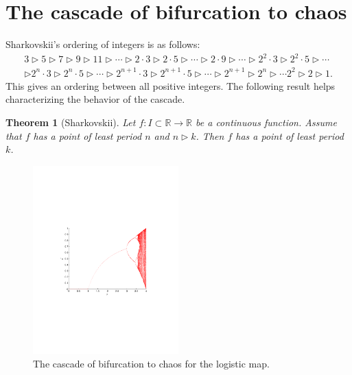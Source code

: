 \documentclass[12pt]{article}
\theoremstyle{plain}
\newtheorem{theorem}{Theorem}[section]
\def\IR{\mathbb{R}}
\begin{document}
\section{The cascade of bifurcation to chaos}
\label{sec:chaos}
Sharkovskii's ordering of integers is as follows:
\begin{gather*}
3\triangleright 5\triangleright 7 \triangleright 9 \triangleright 11\triangleright \cdots \triangleright 2\cdot 3\triangleright  2\cdot 5\triangleright \cdots \triangleright 2\cdot 9\triangleright\cdots\triangleright 2^2\cdot 3\triangleright 2^2\cdot 5\triangleright \cdots \\
\triangleright 2^n\cdot 3\triangleright 2^n\cdot 5\triangleright \cdots\triangleright 2^{n+1}\cdot 3\triangleright 2^{n+1}\cdot 5\triangleright \cdots
\triangleright 2^{n+1}\triangleright 2^n\triangleright \cdots 2^2 \triangleright 2\triangleright 1.
\end{gather*}
This gives an ordering between all positive integers. The following result helps characterizing the behavior of the cascade.
\begin{theorem}[Sharkovskii]\label{th:sharkovskii}
Let $f:I\subset\IR\to\IR$ be a continuous function. Assume that $f$ has a point of least period $n$ and $n\triangleright k$. Then $f$ has a point of least period $k$.
\end{theorem}


\begin{figure}[htbp]
\begin{center}
\includegraphics[width=0.5\textwidth]{cascade_full}
\end{center}
\caption{The cascade of bifurcation to chaos for the logistic map.}
\end{figure}
\end{document}
